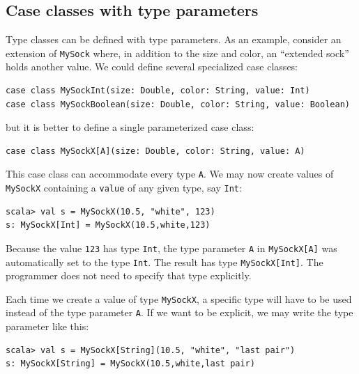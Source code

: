 \subsection{Case classes with type parameters}

Type classes can be defined with type parameters.
As an example, consider an extension of \lstinline!MySock! where,
in addition to the size and color, an \textsf{``}extended sock\textsf{''} holds another
value. We could define several specialized case classes:
\begin{lstlisting}
case class MySockInt(size: Double, color: String, value: Int)
case class MySockBoolean(size: Double, color: String, value: Boolean)
\end{lstlisting}
but it is better to define a single parameterized case class:
\begin{lstlisting}
case class MySockX[A](size: Double, color: String, value: A)
\end{lstlisting}
This case class can accommodate every type \lstinline!A!. We may
now create values of \lstinline!MySockX! containing a \lstinline!value!
of any given type, say \lstinline!Int!:
\begin{lstlisting}
scala> val s = MySockX(10.5, "white", 123)
s: MySockX[Int] = MySockX(10.5,white,123) 
\end{lstlisting}
Because the value \lstinline!123! has type \lstinline!Int!, the
type parameter \lstinline!A! in \lstinline!MySockX[A]! was automatically
set to the type \lstinline!Int!. The result has type \lstinline!MySockX[Int]!.
The programmer does not need to specify that type explicitly.

Each time we create a value of type \lstinline!MySockX!, a specific
type will have to be used instead of the type parameter \lstinline!A!.
If we want to be explicit, we may write the type parameter like this:
\begin{lstlisting}
scala> val s = MySockX[String](10.5, "white", "last pair")
s: MySockX[String] = MySockX(10.5,white,last pair) 
\end{lstlisting}

